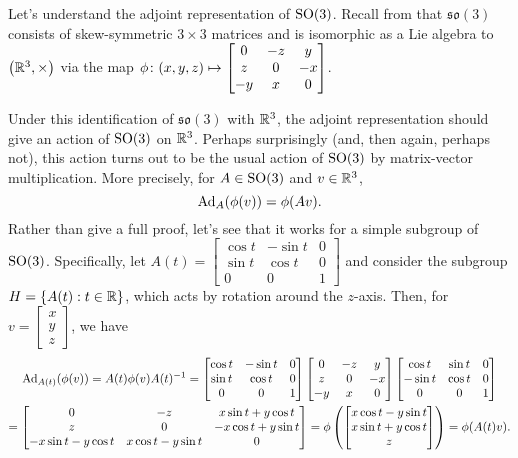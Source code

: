\begin{example}
	Let's understand the adjoint representation of $\operatorname{SO}(3)$. Recall from  that $\mathfrak{so}(3)$ consists of skew-symmetric $3 \times 3$ matrices and is isomorphic as a Lie algebra to $\left(\mathbb{R}^3, \times \right)$ via the map $\phi \colon\thinspace\! (x,y,z) \mapsto \begin{bmatrix} 0 & -z & y \\ z & 0 & -x \\ -y & x & 0 \end{bmatrix}$.
	
	Under this identification of $\mathfrak{so}(3)$ with $\mathbb{R}^3$, the adjoint representation should give an action of $\operatorname{SO}(3)$ on $\mathbb{R}^3$. Perhaps surprisingly (and, then again, perhaps not), this action turns out to be the usual action of $\operatorname{SO}(3)$ by matrix-vector multiplication. More precisely, for $A \in \operatorname{SO}(3)$ and $v \in \mathbb{R}^3$,
	\[
		\operatorname{Ad}_A(\phi(v)) = \phi(Av).
	\]
	Rather than give a full proof, let's see that it works for a simple subgroup of $\operatorname{SO}(3)$. Specifically, let $A(t) = \begin{bmatrix} \cos t & -\sin t & 0 \\ \sin t & \cos t & 0 \\ 0 & 0 & 1 \end{bmatrix}$ and consider the subgroup $H = \left\{ A(t) : t \in \mathbb{R}\right\}$, which acts by rotation around the $z$-axis. Then, for $v = \begin{bmatrix}x \\ y \\ z \end{bmatrix}$, we have
	\begin{multline*}
		\operatorname{Ad}_{A(t)}(\phi(v)) = A(t) \phi(v) A(t)^{-1} = \begin{bmatrix} \cos t & -\sin t & 0 \\ \sin t & \cos t & 0 \\ 0 & 0 & 1 \end{bmatrix} \begin{bmatrix} 0 & -z & y \\ z & 0 & -x \\ -y & x & 0 \end{bmatrix} \begin{bmatrix} \cos t & \sin t & 0 \\ -\sin t & \cos t & 0 \\ 0 & 0 & 1 \end{bmatrix} \\
		= \begin{bmatrix} 0 & -z & x \sin t + y \cos t \\ z & 0 & -x \cos t + y \sin t \\ -x \sin t - y \cos t & x \cos t - y \sin t & 0 \end{bmatrix} = \phi \left( \begin{bmatrix} x \cos t - y \sin t \\ x \sin t + y \cos t\\ z \end{bmatrix}\right) = \phi(A(t)v).
	\end{multline*}
	

\end{example}
